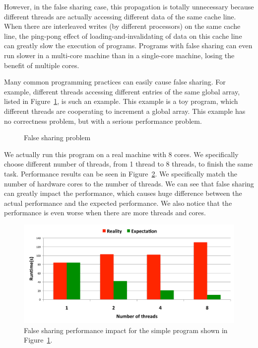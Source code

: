 However, in the false sharing case, this propagation is totally unnecessary because different threads are  actually accessing different data of the same cache line. 
When there are interleaved writes (by different processors) on the same cache line, the ping-pong effect of loading-and-invalidating of data on this cache line can greatly slow the execution of programs. 
Programs with false sharing can even run slower in a multi-core machine than in a single-core machine, losing the benefit of multiple cores.  

Many common programming practices can easily cause false sharing. For example, different threads accessing different entries of the same global array, listed in Figure~\ref{fig:falsesharingexample}, is such an example. This example is a toy program, which different threads are cooperating to increment a global array. This example has no correctness problem, but with a serious performance problem. 

\begin{figure}[!ht]
{\centering
\fbox{
\subfigure{}
\hspace{20pt}
\subfigure{}
}
\caption{False sharing problem
\label{fig:falsesharingexample}}
}
\end{figure}

We actually run this program on a real machine with 8 cores. We specifically choose different number of threads, from 1 thread to 8 threads, to finish the same task. 
Performance results can be seen in Figure~\ref{fig:fsperfimpact}. We specifically match the number of hardware cores to the number of threads. We can see that false sharing can greatly impact the performance, which causes huge difference between the actual performance and the expected performance. We also notice that the performance is even worse when there are more threads and cores. 

\begin{figure}[!t]
\centering
\includegraphics[width=5in]{fig/fsperfimpact.pdf}
\caption{
False sharing performance impact for the simple program shown in Figure~\ref{fig:falsesharingexample}.
\label{fig:fsperfimpact}
}
\end{figure}

